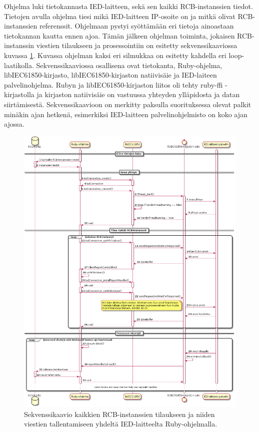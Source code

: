 Ohjelma luki tietokannasta IED-laitteen, sekä sen kaikki RCB-instanssien tiedot. Tietojen avulla ohjelma tiesi mikä IED-laitteen IP-osoite on ja mitkä olivat RCB-instanssien referenssit. Ohjelmaan pystyi syöttämään eri tietoja ainoastaan tietokannan kautta ennen ajoa. Tämän jälkeen ohjelman toiminta, jokaisen RCB-instanssin viestien tilaukseen ja prosessointiin on esitetty sekvenssikaaviossa kuvassa \ref{fig:sequence-diagram-report-subscription}. Kuvassa ohjelman kaksi eri silmukkaa on esitetty kahdella eri loop-laatikolla. Sekvenssikaaviossa osallisena ovat tietokanta, Ruby-ohjelma, libIEC61850-kirjasto, libIEC61850-kirjaston natiivisäie ja IED-laiteen palvelinohjelma. Rubyn ja libIEC61850-kirjaston liitos oli tehty ruby-ffi -kirjastolla ja kirjaston natiivisäie on vastuussa yhteyden ylläpidosta ja datan siirtämisestä. Sekvenssikaavioon on merkitty paksulla suorituksessa olevat palkit minäkin ajan hetkenä, esimerkiksi IED-laitteen palvelinohjelmisto on koko ajan ajossa.

\begin{figure}
	\includegraphics[width=1\textwidth]{pictures/sequence-diagram-report-subscription.png}
	\caption{Sekvenssikaavio kaikkien RCB-instanssien tilaukseen ja niiden viestien tallentamiseen yhdeltä IED-laitteelta Ruby-ohjelmalla.}
	\label{fig:sequence-diagram-report-subscription}
\end{figure}

